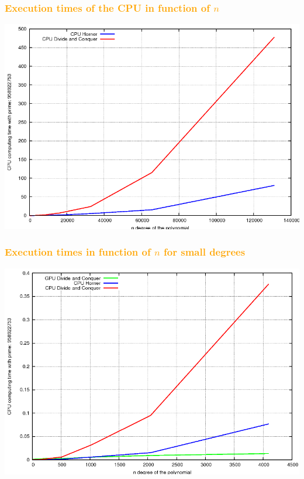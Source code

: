 \begin{frame}[fragile]
\frametitle{\textbf{\textcolor{orange}{Execution times of the CPU in function of $n$}}}

\begin{center}
\includegraphics[scale=0.25]{eps/CPUtime_n.png}\\
\end{center}


\end{frame}

\begin{frame}[fragile]
\frametitle{\textbf{\textcolor{orange}{Execution times in function of $n$ for small degrees}}}

\begin{center}
\includegraphics[scale=0.25]{eps/time_small_n.png}\\
\end{center}

\end{frame}

